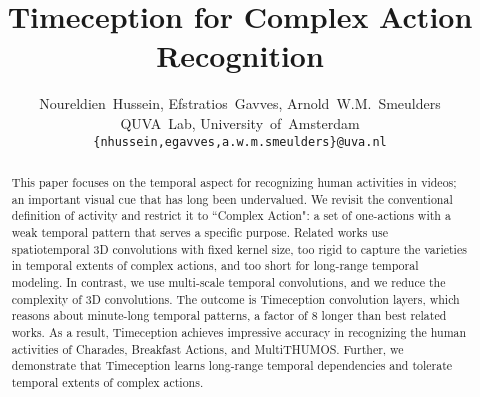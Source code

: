 \documentclass[10pt,twocolumn,letterpaper]{article}
\begin{document}
\title{Timeception for Complex Action Recognition}

\author{
Noureldien~Hussein, Efstratios~Gavves, Arnold~W.M.~Smeulders
\\
QUVA~Lab, University~of~Amsterdam
\\
{\tt\small\{nhussein,egavves,a.w.m.smeulders\}@uva.nl}}

\maketitle


\begin{abstract}
This paper focuses on the temporal aspect for recognizing human activities in videos; an important visual cue that has long been undervalued.
We revisit the conventional definition of activity and restrict it to ``Complex Action": a set of one-actions with a weak temporal pattern that serves a specific purpose.
Related works use spatiotemporal 3D convolutions with fixed kernel size, too rigid to capture the varieties in temporal extents of complex actions, and too short for long-range temporal modeling.
In contrast, we use multi-scale temporal convolutions, and we reduce the complexity of 3D convolutions. The outcome is Timeception convolution layers, which reasons about minute-long temporal patterns, a factor of 8 longer than best related works.
As a result, Timeception achieves impressive accuracy in recognizing the human activities of Charades, Breakfast Actions, and MultiTHUMOS.
Further, we demonstrate that Timeception learns long-range temporal dependencies and tolerate temporal extents of complex actions.
\vspace{-15pt}
\end{abstract}
\end{document}
